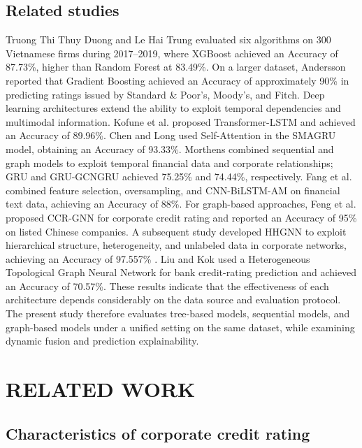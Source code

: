 \documentclass[10pt,twoside]{article}
\begin{document}
\subsection{Related studies}
Truong Thi Thuy Duong and Le Hai Trung \cite{thuy_ung_2023} evaluated six algorithms on 300 Vietnamese firms during 2017--2019, where XGBoost achieved an Accuracy of 87.73\%, higher than Random Forest at 83.49\%. On a larger dataset, Andersson \cite{andersson_machine_2023} reported that Gradient Boosting achieved an Accuracy of approximately 90\% in predicting ratings issued by Standard \& Poor's, Moody's, and Fitch. Deep learning architectures extend the ability to exploit temporal dependencies and multimodal information. Kofune et al. \cite{kofune_enhancing_2026} proposed Transformer-LSTM and achieved an Accuracy of 89.96\%. Chen and Long \cite{chen_novel_2020} used Self-Attention in the SMAGRU model, obtaining an Accuracy of 93.33\%. Morthens \cite{morthens_1989-_credit_2024} combined sequential and graph models to exploit temporal financial data and corporate relationships; GRU and GRU-GCNGRU achieved 75.25\% and 74.44\%, respectively. Fang et al. \cite{fang_design_2025} combined feature selection, oversampling, and CNN-BiLSTM-AM on financial text data, achieving an Accuracy of 88\%. For graph-based approaches, Feng et al. \cite{feng_every_2020} proposed CCR-GNN for corporate credit rating and reported an Accuracy of 95\% on listed Chinese companies. A subsequent study developed HHGNN to exploit hierarchical structure, heterogeneity, and unlabeled data in corporate networks, achieving an Accuracy of 97.557\% \cite{feng_corporate_2024}. Liu and Kok \cite{liu_prediction_2025} used a Heterogeneous Topological Graph Neural Network for bank credit-rating prediction and achieved an Accuracy of 70.57\%. These results indicate that the effectiveness of each architecture depends considerably on the data source and evaluation protocol. The present study therefore evaluates tree-based models, sequential models, and graph-based models under a unified setting on the same dataset, while examining dynamic fusion and prediction explainability.

\section{RELATED WORK}

\subsection{Characteristics of corporate credit rating}
\end{document}
